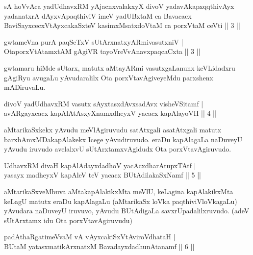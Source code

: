 \begin{kandikeshl}
sA hoVvAca yadUdhavxRM yAjacnxvalakxyX divoV yadavAkapxqqthivAyx yadanatxrA dAyxvApaqthiviV imeV yadUBxtaM ca Bavacacx BaviSayxcecxVtAyxcakaSxteV kasimxMsatxdoVtaM ca porxVtaM ceVti || 3 ||
\end{kandikeshl}

\begin{shl}
gwtameVna purA paqSeTxV sUtArxnatxyARmivasutxniV |\\
OtaporxVtAtamxtAM gAgiVR tayoVreVvAnavxpaqcaCxta \hfill || 3 ||
\end{shl}

\begin{artha}%
gwtamaru hiMde sUtarx, matutx aMtayARmi vasutxgaLanunx keVLidadxru gAgiRyu avugaLu yAvudaralilx Ota porxVtavAgiveyeMdu parxshenx mADiruvaLu.
\end{artha}


\begin{shl}
divoV yadUdhavxRM vasutx sAyxtasxdAvx\s sadAvx visheVSitamf |\\
avARgayxcacx kapAlAtAsxyXnamxdheyxV yacacx kapAlayoVH \hfill || 4 ||
\end{shl}

\begin{artha}
aMtarikaSxkekx yAvudu meVlAgiruvudu satAtxgali asatAtxgali matutx barxhAmxMDakapAlakekx Icege yAvudiruvudo. eraDu kapAlagaLa naDuveyU yAvudu iruvudo avelalxvU sUtArxtamxvAgidudx Ota porxVtavAgiruvudo.
\end{artha}


\begin{shl}
UdhavxRM divaH kapAlAdayxdadhoV yacAcxdharAtupxTAtf |\\
yasayx madheyxV kapAleV teV yacacx BUtAdilakaSxNamf \hfill || 5 ||
\end{shl}

\begin{artha}
aMtarikaSxveMbuva aMtakapAlakikxMta meVlU, keLagina kapAlakikxMta keLagU matutx eraDu kapAlagaLu (aMtarikaSx loVka paqthiviVloVkagaLu) yAvudara naDuveyU iruvuvo, yAvudu BUtAdigaLa savxrUpadalilxruvudo. (adeV sUtArxtamx idu Ota porxVtavAgiruvudu)
\end{artha}

\begin{shl}
padAthaRgatimeVvaM vA vAyxcakiSxVtAviroVdhataH |\\
BUtaM yatasxmatikArxnatxM BavadayxdadhunAtanamf \hfill || 6 ||
\end{shl}


